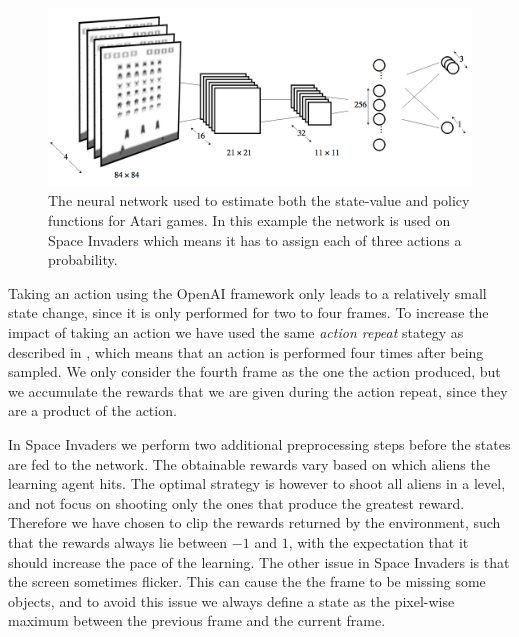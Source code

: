 \documentclass[11pt]{article}
\begin{document}
\begin{figure}[H]
    \centering
    \includegraphics[scale=0.25]{include/Atari_network.png}
    \caption{The neural network used to estimate both the state-value
             and policy functions for Atari games. In this example the network
             is used on Space Invaders which means it has to assign each of three actions a probability.}
    \label{fig:atari_network}
\end{figure}

Taking an action using the OpenAI framework only leads to a relatively small state change,
since it is only performed for two to four frames.
To increase the impact of taking an action we have used the same \textit{action repeat}
stategy as described in \cite{a3c}, which means that an action is performed four times
after being sampled.
We only consider the fourth frame as the one the action produced, but we accumulate the rewards that
we are given during the action repeat, since they are a product of the action.

In Space Invaders we perform two additional preprocessing steps before
the states are fed to the network.
The obtainable rewards vary based on which aliens the learning agent
hits.
The optimal strategy is however to shoot all aliens in a level, and not focus on
shooting only the ones that produce the greatest reward.
Therefore we have chosen to clip the rewards returned by the environment, such that
the rewards always lie between $-1$ and $1$, with the expectation that it should increase
the pace of the learning.
The other issue in Space Invaders is that the screen sometimes flicker.
This can cause the the frame to be missing some objects, and
to avoid this issue we always define a state as the pixel-wise maximum
between the previous frame and the current frame.
\end{document}
